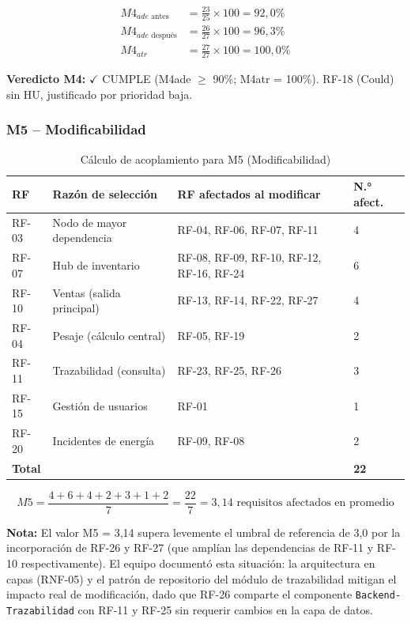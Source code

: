 \documentclass[11pt,a4paper]{article}
\begin{document}
\begin{align*}
M4_{ade\text{ antes}} &= \frac{23}{25} \times 100 = 92{,}0\% \\
M4_{ade\text{ después}} &= \frac{26}{27} \times 100 = 96{,}3\% \\
M4_{atr} &= \frac{27}{27} \times 100 = 100{,}0\%
\end{align*}

\textbf{Veredicto M4:} $\checkmark$ CUMPLE (M4ade $\geq$ 90\%; M4atr = 100\%). RF-18 (Could) sin HU, justificado por prioridad baja.

\subsubsection{M5 -- Modificabilidad}

\begin{longtable}{|p{1.5cm}|p{4cm}|p{7cm}|p{1.5cm}|}
\caption{Cálculo de acoplamiento para M5 (Modificabilidad)}\\
\hline
\textbf{RF} & \textbf{Razón de selección} & \textbf{RF afectados al modificar} & \textbf{N.° afect.} \\
\hline
RF-03 & Nodo de mayor dependencia & RF-04, RF-06, RF-07, RF-11 & 4 \\
RF-07 & Hub de inventario & RF-08, RF-09, RF-10, RF-12, RF-16, RF-24 & 6 \\
RF-10 & Ventas (salida principal) & RF-13, RF-14, RF-22, RF-27 & 4 \\
RF-04 & Pesaje (cálculo central) & RF-05, RF-19 & 2 \\
RF-11 & Trazabilidad (consulta) & RF-23, RF-25, RF-26 & 3 \\
RF-15 & Gestión de usuarios & RF-01 & 1 \\
RF-20 & Incidentes de energía & RF-09, RF-08 & 2 \\
\hline
\textbf{Total} & & & \textbf{22} \\
\hline
\end{longtable}

$$M5 = \frac{4 + 6 + 4 + 2 + 3 + 1 + 2}{7} = \frac{22}{7} = 3{,}14 \text{ requisitos afectados en promedio}$$

\textbf{Nota:} El valor M5 = 3,14 supera levemente el umbral de referencia de 3,0 por la incorporación de RF-26 y RF-27 (que amplían las dependencias de RF-11 y RF-10 respectivamente). El equipo documentó esta situación: la arquitectura en capas (RNF-05) y el patrón de repositorio del módulo de trazabilidad mitigan el impacto real de modificación, dado que RF-26 comparte el componente \texttt{Backend-Trazabilidad} con RF-11 y RF-25 sin requerir cambios en la capa de datos.
\end{document}
